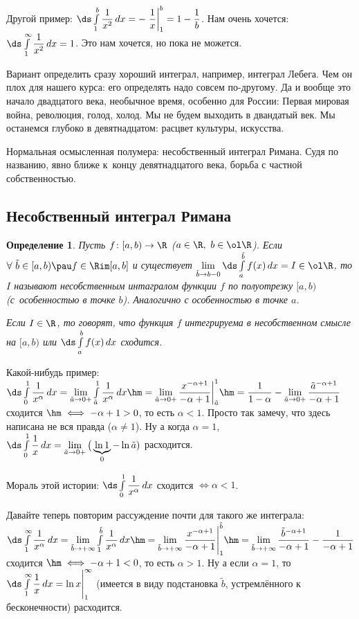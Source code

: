 \documentclass[a4paper,10pt,twoside]{article}
\newtheorem{Def}{Определение}[section]
\begin{document}
    Другой пример: $\ds\int\limits_1^b\dfrac1{x^2}\,dx=-\left.\dfrac1x\right|_1^b=1-\dfrac1b$. Нам очень хочется: $\ds\int\limits_1^\infty\dfrac1{x^2}\,dx=1$.
    Это нам хочется, но пока не можется.
    
    Вариант определить сразу хороший интеграл, например, интеграл Лебега. Чем он плох для нашего курса: его определять надо совсем по-другому.
    Да и вообще это начало двадцатого века, необычное время, особенно для России: Первая мировая война, революция, голод, холод. Мы не будем выходить в двандатый век. Мы останемся
    глубоко в девятнадцатом: расцвет культуры, искусства.
    
    Нормальная осмысленная полумера: несобственный интеграл Римана. Судя по названию, явно ближе к~концу девятнадцатого века, борьба с частной собственностью.
    
   \subsection{Несобственный интеграл Римана}
   \begin{Def}
   	Пусть $f\colon[a,b)\to\R$ ($a\in\R,\ b\in\ol\R$). Если $\forall\  \tilde b\in[a,b)\pau f\in\Rim[a,b]$ и существует $\lim\limits_{\tilde b\to b-0}
   	\ds\int\limits_a^{\tilde b}f(x)\,dx=I\in\ol\R$, то
   	$I$ называют несобственным интагралом функции $f$ по полуотрезку $[a,b)$ (с~особенностью в точке $b$). Аналогично с особенностью в точке $a$.
   	
   	Если $I\in\R$, то говорят, что функция $f$ интегрируема в несобственном смысле на $[a,b)$ или $\ds\int\limits_a^bf(x)\,dx$ сходится.
   \end{Def}   
   
   Какой-нибудь пример: $\ds\int\limits_0^1\dfrac1{x^\alpha}\,dx=\lim\limits_{\tilde a\to0+}\int\limits_{\tilde a}^1\dfrac1{x^\alpha}\,dx\hm=
   \lim\limits_{\tilde a\to 0+}\dfrac{x^{-\alpha+1}}{-\alpha+1}\bigg|_{\tilde a}^1\hm=\dfrac1{1-\alpha}-\lim\limits_{\tilde a\to 0+}\dfrac{\tilde a^{-\alpha+1}}{-\alpha+1}$ сходится $\hm\iff-\alpha+1>0$,
   то есть $\alpha<1$. Просто так замечу, что здесь написана не вся правда ($\alpha\neq 1$). Ну а когда $\alpha=1$,
   \pau $\ds\int\limits_0^1\dfrac1x\,dx=\lim\limits_{\tilde a\to0+}\big(\underbrace{\ln 1}_0-\ln\tilde a)$ расходится.
   
   Мораль этой истории: $\ds\int\limits_0^1\dfrac1{x^\alpha}\,dx$ сходится $\iff\alpha<1$.
   
   Давайте теперь повторим рассуждение почти для такого же интеграла: $\ds\int\limits_1^\infty\dfrac1{x^\alpha}\,dx=\lim\limits_{\tilde b\to +\infty}
   \int\limits_1^{\tilde b}\dfrac1{x^\alpha}\,dx\hm=\lim\limits_{\tilde b\to +\infty}\dfrac{x^{-\alpha+1}}{-\alpha+1}\Bigg|_1^{\tilde b}\hm=
   \lim\limits_{\tilde b\to +\infty}\dfrac{\tilde b^{-\alpha+1}}{-\alpha+1}-\dfrac1{-\alpha+1}$ сходится $\hm\iff -\alpha+1<0$,
   то есть $\alpha>1$. Ну а если $\alpha=1$, то $\ds\int\limits_1^\infty\dfrac1x\,dx=\ln x\Bigg|_1^\infty$ (имеется в виду подстановка $\tilde b$, устремлённого к бесконечности) расходится.
   
\end{document}
